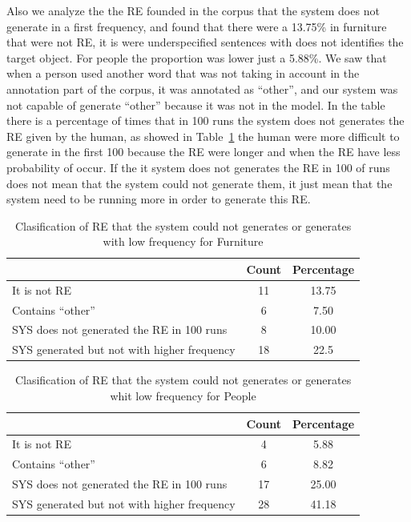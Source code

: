 Also we analyze the the RE founded in the corpus that the system does not generate in a first frequency, and found that there were a 13.75\% in furniture that were not RE, it is were underspecified sentences with does not identifies the target object. For people the proportion was lower just a 5.88\%. We saw that when a person used another word that was not taking in account in the annotation part of the corpus, it was annotated as ``other'', and our system was not capable of generate ``other'' because it was not in the model.
In the table there is a percentage of times that in 100 runs the system does not generates the RE given by the human, as showed in Table~\ref{error-people} the human were more difficult to generate in the first 100 because the RE were longer and when the RE have less probability of occur. If the it system does not generates the RE in 100 of runs does not mean that the system could not generate them, it just mean that the system need to be running more in order to generate this RE.\\


\begin{table}[h!]
\begin{center}
\begin{tabular}{|l|c|c|}
\hline
		& Count		& Percentage\\
\hline
It is not RE	&	11	&	13.75 \\
Contains ``other''	&	6	&	7.50 \\
\hline
SYS does not generated the RE in 100 runs	&	8	&	10.00 \\
SYS generated but not with higher frequency	&	18	&	22.5 \\
\hline
\end{tabular}
\caption{Clasification of RE that the system could not generates or generates with low frequency for Furniture}
\label{error-people}
\end{center}
\end{table}

\begin{table}[h!]
\begin{center}
\begin{tabular}{|l|c|c|}
\hline
			& Count		& Percentage\\
\hline
It is not RE		&	4	&	5.88 \\
Contains ``other''	&	6	&	8.82 \\
\hline
SYS does not generated the RE in 100 runs	&	17	&	25.00 \\
SYS generated but not with higher frequency	&	28	&	41.18 \\

\hline
\end{tabular}
\caption{Clasification of RE that the system could not generates or generates whit low frequency for People}
\label{error-furniture}
\end{center}
\end{table}
